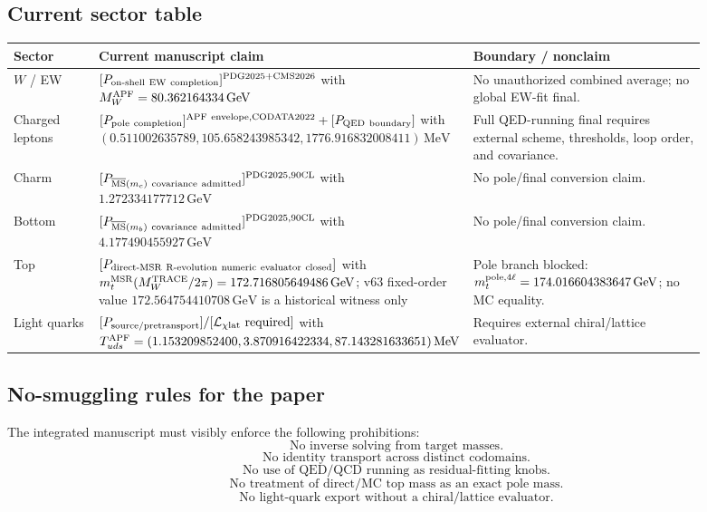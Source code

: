 \subsection{Current sector table}
\begin{center}
\begin{tabular}{p{0.14\linewidth} p{0.39\linewidth} p{0.36\linewidth}}
\hline
Sector & Current manuscript claim & Boundary / nonclaim \\
\hline
$W$ / EW & $[P_{\rm on\text{-}shell\ EW\ completion}]^{\rm PDG2025+CMS2026}$ with $M_W^{\rm APF}=80.362164334\,\mathrm{GeV}$ & No unauthorized combined average; no global EW-fit final. \\
Charged leptons & $[P_{\rm pole\ completion}]^{\rm APF\ envelope,CODATA2022}+[P_{\rm QED\ boundary}]$ with $(0.511002635789,105.658243985342,1776.916832008411)\,\mathrm{MeV}$ & Full QED-running final requires external scheme, thresholds, loop order, and covariance. \\
Charm & $[P_{\overline{\rm MS}(m_c)\ \rm covariance\ admitted}]^{\rm PDG2025,90CL}$ with $1.272334177712\,\mathrm{GeV}$ & No pole/final conversion claim. \\
Bottom & $[P_{\overline{\rm MS}(m_b)\ \rm covariance\ admitted}]^{\rm PDG2025,90CL}$ with $4.177490455927\,\mathrm{GeV}$ & No pole/final conversion claim. \\
Top & $[P_{\rm direct\text{-}MSR\ R\text{-}evolution\ numeric\ evaluator\ closed}]$ with $m_t^{\rm MSR}(M_W^{\rm TRACE}/2\pi)=172.716805649486\,\mathrm{GeV}$; v63 fixed-order value $172.564754410708\,\mathrm{GeV}$ is a historical witness only & Pole branch blocked: $m_t^{\rm pole,4\ell}=174.016604383647\,\mathrm{GeV}$; no MC equality. \\
Light quarks & $[P_{\rm source/pretransport}]/[\mathcal L_{\chi\mathrm{lat}}\ \rm required]$ with $T_{uds}^{\rm APF}=(1.153209852400,3.870916422334,87.143281633651)\,\mathrm{MeV}$ & Requires external chiral/lattice evaluator. \\
\hline
\end{tabular}
\end{center}

\subsection{No-smuggling rules for the paper}
The integrated manuscript must visibly enforce the following prohibitions:
\[
\boxed{\text{No inverse solving from target masses.}}
\]
\[
\boxed{\text{No identity transport across distinct codomains.}}
\]
\[
\boxed{\text{No use of QED/QCD running as residual-fitting knobs.}}
\]
\[
\boxed{\text{No treatment of direct/MC top mass as an exact pole mass.}}
\]
\[
\boxed{\text{No light-quark export without a chiral/lattice evaluator.}}
\]

